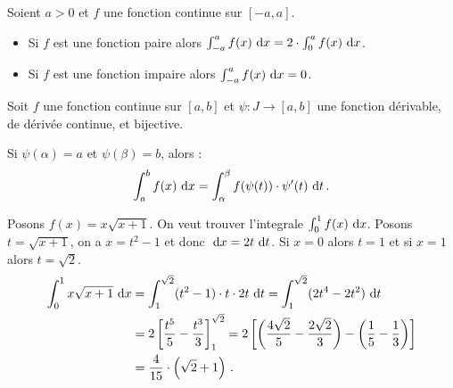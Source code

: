       
      \begin{prop}
            Soient $a>0$ et $f$ une fonction continue sur $[-a,a]$.
            \begin{itemize}
                  \item Si $f$ est une fonction paire alors $\int_{-a}^{a} f(x) ~\mathrm{d}x = 2 \cdot \int_{0}^{a} f(x) ~\mathrm{d}x$.
                  \item Si $f$ est une fonction impaire alors $\int_{-a}^{a} f(x) ~\mathrm{d}x = 0$.
            \end{itemize}
      \end{prop}
      \begin{thm}
      Soit $f$ une fonction continue sur $[a,b]$ et $\psi : J \rightarrow [a,b]$ une fonction d\'erivable, de d\'eriv\'ee continue, et bijective.
      
      Si $\psi (\alpha) = a$ et $\psi (\beta) = b$, alors : 
            \begin{equation*}
                  \int_{a}^{b} f(x) ~\mathrm{d}x = \int_{\alpha}^{\beta} f(\psi(t)) \cdot \psi'(t) ~\mathrm{d}t      \,.
            \label{eq:changement de variable integrale}
            \end{equation*}
            \begin{ex}
                  Posons $f(x) = x \sqrt{x+1}$.
                  On veut trouver l'integrale $\int_{0}^{1} f(x) ~\mathrm{d}x$.
                  Posons $t = \sqrt{x+1}$, on a $x = t^2 - 1$ et donc $~\mathrm{d}x = 2t ~\mathrm{d}t$.
                  Si $x=0$ alors $t=1$ et si $x=1$ alors $t=\sqrt{2}$.
                  \begin{align*}
                  \int_{0}^{1} x \sqrt{x+1} ~\mathrm{d}x & = \int_{1}^{\sqrt{2}} (t^2 - 1) \cdot t \cdot 2t ~\mathrm{d}t                      
                                                  = \int_{1}^{\sqrt{2}} (2t^4 - 2t^2) ~\mathrm{d}t                                   \\
                                                & = 2 \left[ \frac{t^5}{5} - \frac{t^3}{3} \right]_{1}^{\sqrt{2}}           
                                                  = 2 \left[ 
                                                      \left( \frac{4\sqrt{2}}{5}-\frac{2\sqrt{2}}{3} \right) 
                                                      -
                                                      \left( \frac{1}{5} - \frac{1}{3} \right)
                                                      \right]                                                               \\
                                                & = \frac{4}{15} \cdot \left(\sqrt{2} + 1 \right)                           \,.
                  \end{align*}
            \end{ex}
      \end{thm}
